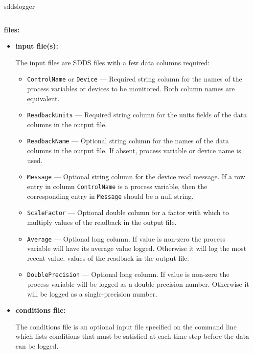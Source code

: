 \begin{sddsprog}{sddslogger}
\begin{verbatim}
\end{verbatim}
\item \textbf{files:}
\begin{itemize}
  \item \textbf{input file(s):}\par
      The input files are SDDS files with a few data columns required:
  \begin{itemize}
    \item {\tt ControlName} or {\tt Device} --- Required string column for the names of the process variables
          or devices to be monitored. Both column names are equivalent.
    \item {\tt ReadbackUnits} --- Required string column for the units fields of the data columns in the
          output file.
    \item {\tt ReadbackName} --- Optional string column for the names of the data columns in the
          output file. If absent, process variable or device name is used.
    \item {\tt Message} --- Optional string column for the device read message. If a row entry in
          column {\tt ControlName} is a process variable, then the corresponding entry
          in {\tt Message} should be a null string.
    \item {\tt ScaleFactor} --- Optional double column for a factor with which to multiply
          values of the readback in the output file.
    \item {\tt Average} --- Optional long column.  If value is non-zero the process variable will have
          its average value logged.  Otherwise it will log the most recent value.
          values of the readback in the output file.
    \item {\tt DoublePrecision} --- Optional long column. If value is non-zero the process variable
          will be logged as a double-precision number.  Otherwise it will be logged as a single-precision
          number.
  \end{itemize}

  \item \textbf{conditions file:} \par
      The conditions file is an optional input file specified on the command line which lists
      conditions that must be satisfied at each time step before the data can be logged.


\end{itemize}
\end{sddsprog}
